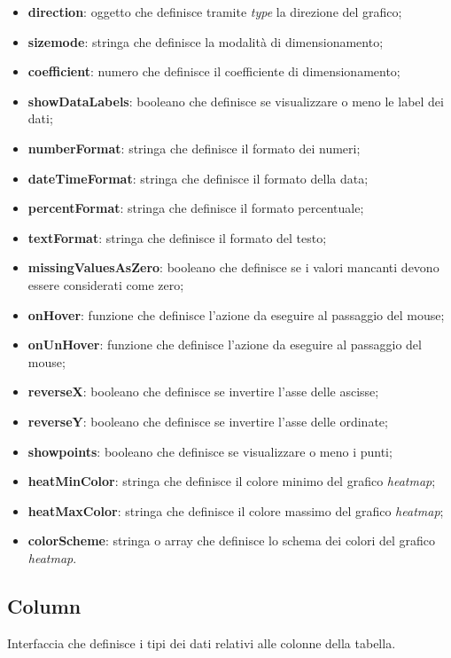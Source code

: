 \begin{itemize}
      \item \textbf{direction}: oggetto che definisce tramite \textit{type} la direzione del grafico;
      \item \textbf{sizemode}: stringa che definisce la modalità di dimensionamento;
      \item \textbf{coefficient}: numero che definisce il coefficiente di dimensionamento;
      \item \textbf{showDataLabels}: booleano che definisce se visualizzare o meno le label dei dati;
      \item \textbf{numberFormat}: stringa che definisce il formato dei numeri;
      \item \textbf{dateTimeFormat}: stringa che definisce il formato della data;
      \item \textbf{percentFormat}: stringa che definisce il formato percentuale;
      \item \textbf{textFormat}: stringa che definisce il formato del testo;
      \item \textbf{missingValuesAsZero}: booleano che definisce se i valori mancanti devono essere considerati come zero;
      \item \textbf{onHover}: funzione che definisce l'azione da eseguire al passaggio del mouse;
      \item \textbf{onUnHover}: funzione che definisce l'azione da eseguire al passaggio del mouse;
      \item \textbf{reverseX}: booleano che definisce se invertire l'asse delle ascisse;
      \item \textbf{reverseY}: booleano che definisce se invertire l'asse delle ordinate;
      \item \textbf{showpoints}: booleano che definisce se visualizzare o meno i punti;
      \item \textbf{heatMinColor}: stringa che definisce il colore minimo del grafico \textit{heatmap};
      \item \textbf{heatMaxColor}: stringa che definisce il colore massimo del grafico \textit{heatmap};
      \item \textbf{colorScheme}: stringa o array che definisce lo schema dei colori del grafico \textit{heatmap}.
\end{itemize}

\subsection{Column}
Interfaccia che definisce i tipi dei dati relativi alle colonne della tabella.

